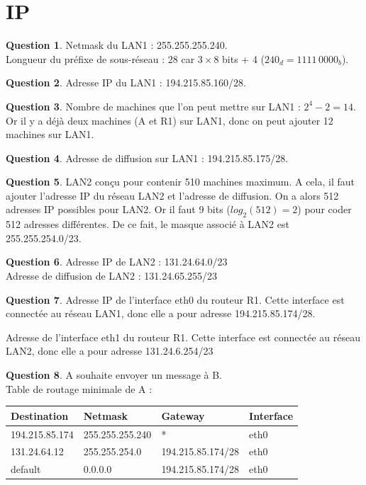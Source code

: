 \documentclass[11pt,english,french]{scrreprt}
\theoremstyle{remark}
\theoremstyle{definition}
\newtheorem{ques}{Question}[section]
\begin{document}
\section{IP} %

\begin{ques}
	Netmask du LAN1 : 255.255.255.240.\\
	Longueur du préfixe de sous-réseau : 28 car $3\times 8$ bits + 4 ($240_d=1111\,0000_b$).
\end{ques}

\begin{ques}
	Adresse IP du LAN1 : 194.215.85.160/28.
\end{ques}

\begin{ques}
	Nombre de machines que l'on peut mettre sur LAN1 : $2^4-2 = 14$. Or il y a déjà deux machines (A et R1) sur LAN1, donc on peut ajouter 12 machines sur LAN1.
\end{ques}

\begin{ques}
	Adresse de diffusion sur LAN1 : 194.215.85.175/28.
\end{ques}

\begin{ques}
	LAN2 conçu pour contenir 510 machines maximum. A cela, il faut ajouter l'adresse IP du réseau LAN2 et l'adresse de diffusion. On a alors 512 adresses IP possibles pour LAN2. Or il faut 9 bits ($log_2(512)=2$) pour coder 512 adresses différentes. De ce fait, le masque associé à LAN2 est 255.255.254.0/23.
\end{ques}

\begin{ques}
	Adresse IP de LAN2 : 131.24.64.0/23\\
	Adresse de diffusion de LAN2 : 131.24.65.255/23
\end{ques}

\begin{ques}
	Adresse IP de l'interface eth0 du routeur R1. Cette interface est connectée au réseau LAN1, donc elle a pour adresse 194.215.85.174/28.


	Adresse de l'interface eth1 du routeur R1. Cette interface est connectée au réseau LAN2, donc elle a pour adresse 131.24.6.254/23
\end{ques}

\begin{ques}
	A souhaite envoyer un message à B.\\
	Table de routage minimale de A :
	
	\begin{tabularx}{\textwidth}{XXXX}
		\toprule 
		Destination & Netmask & Gateway & Interface\tabularnewline
		\midrule
		\midrule
		194.215.85.174 & 255.255.255.240 & {*} & eth0\tabularnewline
		\midrule 
		131.24.64.12 & 255.255.254.0 & 194.215.85.174/28 & eth0\tabularnewline
		\midrule 
		default & 0.0.0.0 & 194.215.85.174/28 & eth0\tabularnewline
		\bottomrule
	\end{tabularx}
\end{ques}
\end{document}
